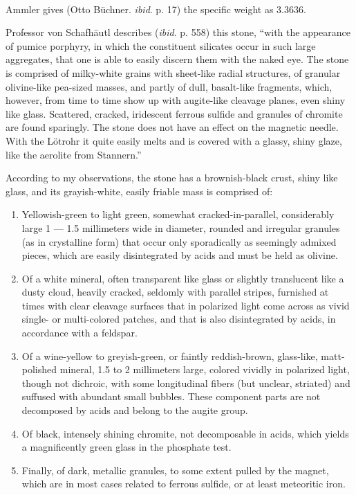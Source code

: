 \documentclass[a4paper, 12pt, oneside]{article}
\begin{document}
\paragraph{}
Ammler gives (Otto Büchner. \emph{ibid}. p. 17) the specific weight as 3.3636.

Professor von Schafhäutl describes (\emph{ibid}. p. 558) this stone, ``with the appearance of pumice porphyry, in which the constituent silicates occur in such large aggregates, that one is able to easily discern them with the naked eye. The stone is comprised of milky-white grains with sheet-like radial structures, of granular olivine-like pea-sized masses, and partly of dull, basalt-like fragments, which, however, from time to time show up with augite-like cleavage planes, even shiny like glass. Scattered, cracked, iridescent ferrous sulfide and granules of chromite are found sparingly. The stone does not have an effect on the magnetic needle. With the Lötrohr it quite easily melts and is covered with a glassy, shiny glaze, like the aerolite from Stannern.''

According to my observations, the stone has a brownish-black crust, shiny like glass, and its grayish-white, easily friable mass is comprised of:
\begin{enumerate}
    \item Yellowish-green to light green, somewhat cracked-in-parallel, considerably large 1 --- 1.5 millimeters wide in diameter, rounded and irregular granules (as in crystalline form) that occur only sporadically as seemingly admixed pieces, which are easily disintegrated by acids and must be held as olivine.
    \item Of a white mineral, often transparent like glass or slightly translucent like a dusty cloud, heavily cracked, seldomly with parallel stripes, furnished at times with clear cleavage surfaces that in polarized light come across as vivid single- or multi-colored patches, and that is also disintegrated by acids, in accordance with a feldspar.
    \item Of a wine-yellow to greyish-green, or faintly reddish-brown, glass-like, matt-polished mineral, 1.5 to 2 millimeters large, colored vividly in polarized light, though not dichroic, with some longitudinal fibers (but unclear, striated) and suffused with abundant small bubbles. These component parts are not decomposed by acids and belong to the augite group.
    \item Of black, intensely shining chromite, not decomposable in acids, which yields a magnificently green glass in the phosphate test.
    \item Finally, of dark, metallic granules, to some extent pulled by the magnet, which are in most cases related to ferrous sulfide, or at least meteoritic iron.
\end{enumerate}
\end{document}
